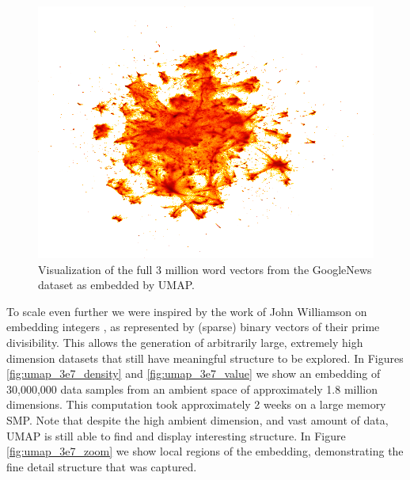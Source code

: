 \documentclass[12pt]{article}
\begin{document}
\begin{figure}[!hpbt]
    \centering
    \includegraphics[width=\textwidth]{three_million_word_vectors.png}
    \caption{Visualization of the full 3 million word vectors from the GoogleNews dataset as embedded by UMAP.}
    \label{fig:umap_word_vectors}
\end{figure}

To scale even further we were inspired by the work of John Williamson on embedding integers \cite{williamson_2018}, as represented by (sparse) binary vectors of their prime divisibility. This allows the generation of arbitrarily large, extremely high dimension datasets that still have meaningful structure to be explored. In Figures \ref{fig:umap_3e7_density} and \ref{fig:umap_3e7_value} we show an embedding of 30,000,000 data samples from an ambient space of approximately 1.8 million dimensions. This computation took approximately 2 weeks on a large memory SMP. Note that despite the high ambient dimension, and vast amount of data, UMAP is still able to find and display interesting structure. In Figure \ref{fig:umap_3e7_zoom} we show local regions of the embedding, demonstrating the fine detail structure that was captured.
\end{document}
